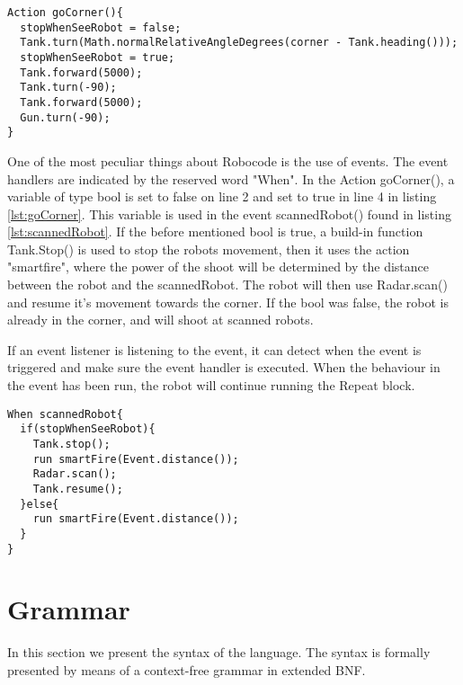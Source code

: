 \begin{lstlisting}[caption={Code listing of the Action goCorner()}, xleftmargin=.2\textwidth, label={lst:goCorner}]
Action goCorner(){
  stopWhenSeeRobot = false;  
  Tank.turn(Math.normalRelativeAngleDegrees(corner - Tank.heading()));      
  stopWhenSeeRobot = true;
  Tank.forward(5000);
  Tank.turn(-90);
  Tank.forward(5000);
  Gun.turn(-90);
}
\end{lstlisting}

One of the most peculiar things about Robocode is the use of events. The event handlers are indicated by the reserved word "When". 
In the Action goCorner(), a variable of type bool is set to false on line 2 and set to true in line 4 in listing \ref{lst:goCorner}. This variable is used in the event scannedRobot() found in listing \ref{lst:scannedRobot}. If the before mentioned bool is true, a build-in function Tank.Stop() is used to stop the robots movement, then it uses the action "smartfire", where the power of the shoot will be determined by the distance between the robot and the scannedRobot. The robot will then use Radar.scan() and resume it's movement towards the corner. If the bool was false, the robot is already in the corner, and will shoot at scanned robots.

If an event listener is listening to the event, it can detect when the event is triggered and make sure the event handler is executed. When the behaviour in the event has been run, the robot will continue running the Repeat block.  


\begin{lstlisting}[caption={Code listing of the event scannedRobot()} label=corners3, xleftmargin=.2\textwidth, label={lst:scannedRobot}]
When scannedRobot{
  if(stopWhenSeeRobot){
    Tank.stop();                                     
    run smartFire(Event.distance());
    Radar.scan();                                     
    Tank.resume();                                   
  }else{
    run smartFire(Event.distance());
  }
}
\end{lstlisting}



\section{Grammar}
\label{sec:Grammar}
In this section we present the syntax of the language. The syntax is formally presented by means of a context-free grammar in extended BNF.

